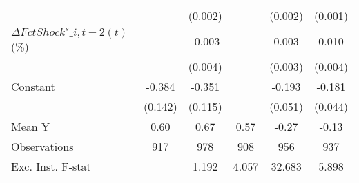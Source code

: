 {\begin{tabular}{l*{5}{c}}
                    &                     &     (0.002)         &                     &     (0.002)         &     (0.001)         \\
\addlinespace
$ \Delta FctShock^s\_{i,t-2}(t)$ (\%)&                     &      -0.003         &                     &       0.003         &       0.010\sym{***}\\
                    &                     &     (0.004)         &                     &     (0.003)         &     (0.004)         \\
\addlinespace
Constant            &      -0.384\sym{***}&      -0.351\sym{***}&                     &      -0.193\sym{***}&      -0.181\sym{***}\\
                    &     (0.142)         &     (0.115)         &                     &     (0.051)         &     (0.044)         \\
\midrule
Mean Y              &        0.60         &        0.67         &        0.57         &       -0.27         &       -0.13         \\
Observations        &         917         &         978         &         908         &         956         &         937         \\
Exc. Inst. F-stat   &                     &       1.192         &       4.057         &      32.683         &       5.898         \\
\bottomrule
\end{tabular}
}
